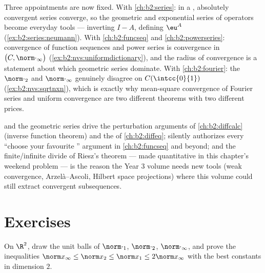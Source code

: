 \begin{remark}\label{rem:b2:nvs:perspectives}
Three appointments are now fixed. With \cref{ch:b2:series}: in
a , absolutely convergent series converge, so the
geometric and exponential series of operators become everyday
tools --- inverting $I - A$, defining $\eu^{A}$
(\cref{ex:b2:series:neumann}). With
\cref{ch:b2:funcseq} and \cref{ch:b2:powerseries}: convergence
of function sequences and power series is convergence in
$\bigl(C, \norm\cdot_\infty\bigr)$
(\cref{ex:b2:nvs:uniformdictionary}), and the radius of
convergence is a statement about which geometric series
dominate. With \cref{ch:b2:fourier}: the 
$\norm\cdot_2$ and $\norm\cdot_\infty$ genuinely disagree on
$C(\intcc{0}{1})$ (\cref{ex:b2:nvs:sqrtnxn}), which is exactly
why mean-square convergence of Fourier series and uniform
convergence are two different theorems with two different
prices.
\end{remark}

\begin{remark}
 and the geometric series drive the perturbation
arguments of \cref{ch:b2:diffcalc} (inverse function theorem) and
the  of \cref{ch:b2:diffeq};  silently authorizes every ``choose your favourite ''
argument in \cref{ch:b2:funcseq} and beyond; and the
finite/infinite divide of Riesz's theorem --- made quantitative in
this chapter's weekend problem --- is the reason the Year 3
volume needs new tools (weak convergence, Arzel\`a--Ascoli,
Hilbert space projections) where this volume could still extract
convergent subsequences.
\end{remark}

\section{Exercises}

\begin{exercise}[$\star$]\label{exo:b2:nvs:1}
On $\R^2$, draw the unit balls of $\norm\cdot_1$, $\norm\cdot_2$,
$\norm\cdot_\infty$, and prove the inequalities $\norm x_\infty
\leq \norm x_2 \leq \norm x_1 \leq 2\norm x_\infty$ with the best
constants in dimension $2$.
\end{exercise}

